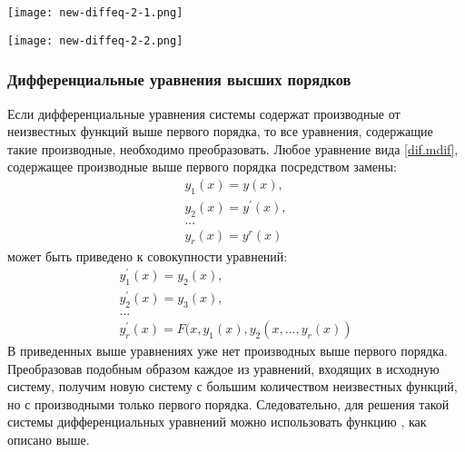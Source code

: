 
\begin{center}
	\texttt{[image: new-diffeq-2-1.png]}
\end{center}

\begin{center}
	\texttt{[image: new-diffeq-2-2.png]}
\end{center}

\subsubsection{Дифференциальные уравнения высших порядков}
Если дифференциальные уравнения системы содержат производные от неизвестных функций выше первого порядка, то все уравнения, содержащие такие производные, необходимо преобразовать. Любое уравнение вида \ref{dif.mdif}, содержащее производные выше первого порядка посредством замены:
\begin{equation}
\begin{gathered}
y_1(x)=y(x),\\ y_2(x)=y^{\prime}(x),\\  ... \\ y_r(x)=y^r(x)
\end{gathered}
\end{equation}
может быть приведено к совокупности уравнений:
\begin{equation}
\begin{gathered}
y_1^{\prime}(x)=y_2(x), \\ y_2^{\prime}(x)=y_3(x), \\ ... \\ y_r^{\prime}(x)=F(x,y_1(x),y_2(x, ... , y_r(x))
\end{gathered}
\end{equation}
В приведенных выше уравнениях уже нет производных выше первого порядка. Преобразовав подобным образом каждое из уравнений, входящих в исходную систему, получим новую систему с большим количеством неизвестных функций, но с производными только первого порядка. Следовательно, для решения такой системы дифференциальных уравнений можно использовать функцию , как описано выше.

